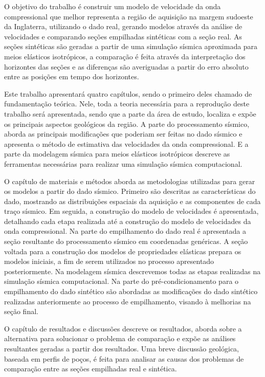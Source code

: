 \documentclass[
	12pt,				%
	openright,			%
	oneside,			%
	a4paper,			%
	english,			%
	brazil				%
	]{abntex2}
\begin{document}
	O objetivo do trabalho é construir um modelo de velocidade da onda compressional que melhor representa a região de aquisição na margem sudoeste da Inglaterra, utilizando o dado real, gerando modelos através da análise de velocidades e comparando seções empilhadas sintéticas com a seção real. As seções sintéticas são geradas a partir de uma simulação sísmica aproximada para meios elásticos isotrópicos, a comparação é feita através da interpretação dos horizontes das seções e as diferenças são averiguadas a partir do erro absoluto entre as posições em tempo dos horizontes.      	
	
	Este trabalho apresentará quatro capítulos, sendo o primeiro deles chamado de fundamentação teórica. Nele, toda a teoria necessária para a reprodução deste trabalho será apresentada, sendo que a parte da área de estudo, localiza e expõe os principais aspectos geológicos da região. A parte do processamento sísmico, aborda as principais modificações que poderiam ser feitas no dado sísmico e apresenta o método de estimativa das velocidades da onda compressional. E a parte da modelagem sísmica para meios elásticos isotrópicos descreve as ferramentas necessárias para realizar uma simulação sísmica computacional.
	
	O capítulo de materiais e métodos aborda as metodologias utilizadas para gerar os modelos a partir do dado sísmico. Primeiro são descritas as características do dado, mostrando as distribuições espaciais da aquisição e as componentes de cada traço sísmico. Em seguida, a construção do modelo de velocidades é apresentada, detalhando cada etapa realizada até a construção do modelo de velocidades da onda compressional. Na parte do empilhamento do dado real é apresentada a seção resultante do processamento sísmico em coordenadas genéricas. A seção voltada para a construção dos modelos de propriedades elásticas prepara os modelos iniciais, a fim de serem utilizados no processo apresentado posteriormente. Na modelagem sísmica descrevemos todas as etapas realizadas na simulação sísmica computacional. Na parte do pré-condicionamento para o empilhamento do dado sintético são abordadas as modificações do dado sintético realizadas anteriormente ao processo de empilhamento, visando à melhorias na seção final.       	

	O capítulo de resultados e discussões descreve os resultados, aborda sobre a alternativa para solucionar o problema de comparação e expõe as análises resultantes geradas a partir dos resultados. Uma breve discussão geológica, baseada em perfis de poços, é feita para analisar as causas dos problemas de comparação entre as seções empilhadas real e sintética.	
\end{document}
